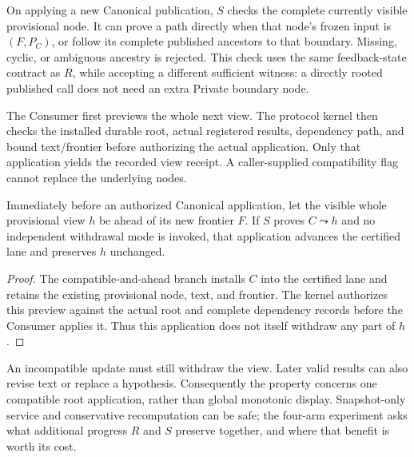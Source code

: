 On applying a new Canonical publication, $S$ checks the complete currently
visible provisional node. It can prove a path directly when that node's
frozen input is $(F,P_C)$, or follow its complete published ancestors to
that boundary. Missing, cyclic, or ambiguous ancestry is rejected. This
check uses the same feedback-state contract as $R$, while accepting a
different sufficient witness: a directly rooted published call does not
need an extra Private boundary node.

The Consumer first previews the whole next view. The protocol kernel then
checks the installed durable root, actual registered results, dependency
path, and bound text/frontier before authorizing the actual application.
Only that application yields the recorded view receipt. A caller-supplied
compatibility flag cannot replace the underlying nodes.

\begin{proposition}
\label{prop:continuity}
Immediately before an authorized Canonical application, let the visible
whole provisional view $h$ be ahead of its new frontier $F$. If $S$ proves
$C\leadsto h$ and no independent withdrawal mode is invoked, that
application advances the certified lane and preserves $h$ unchanged.
\end{proposition}
\begin{proof}
The compatible-and-ahead branch installs $C$ into the certified lane and
retains the existing provisional node, text, and frontier. The kernel
authorizes this preview against the actual root and complete dependency
records before the Consumer applies it. Thus this application does not
itself withdraw any part of $h$.
\end{proof}

An incompatible update must still withdraw the view. Later valid results
can also revise text or replace a hypothesis. Consequently the property
concerns one compatible root application, rather than global monotonic
display. Snapshot-only service and conservative recomputation can be safe;
the four-arm experiment asks what additional progress $R$ and $S$ preserve
together, and where that benefit is worth its cost.
